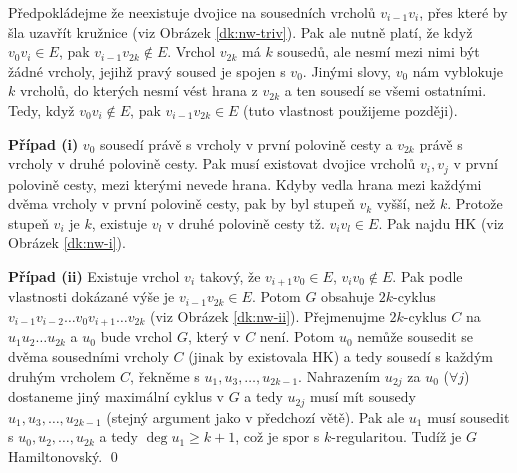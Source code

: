 Předpokládejme že neexistuje dvojice na sousedních vrcholů $v_{i-1}v_i$, přes které by šla uzavřít kružnice (viz Obrázek \ref{dk:nw-triv}). Pak ale nutně platí, že když $v_0v_i \in E$, pak $v_{i-1}v_{2k} \not\in E$. Vrchol $v_{2k}$ má $k$ sousedů, ale nesmí mezi nimi být žádné vrcholy, jejihž pravý soused je spojen s $v_0$. Jinými slovy, $v_0$ nám vyblokuje $k$ vrcholů, do kterých nesmí vést hrana z $v_{2k}$ a ten sousedí se všemi ostatními. Tedy, když $v_0v_i \not\in E$, pak $v_{i-1}v_{2k} \in E$ (tuto vlastnost použijeme později).

\textbf{Případ (i)} $v_0$ sousedí právě s vrcholy v první polovině cesty a $v_{2k}$ právě s vrcholy v druhé polovině cesty. Pak musí existovat dvojice vrcholů $v_i,v_j$ v první polovině cesty, mezi kterými nevede hrana. Kdyby vedla hrana mezi každými dvěma vrcholy v první polovině cesty, pak by byl stupeň $v_k$ vyšší, než $k$. Protože stupeň $v_i$ je $k$, existuje $v_l$ v druhé polovině cesty tž. $v_iv_l \in E$. Pak najdu HK (viz Obrázek \ref{dk:nw-i}).

\textbf{Případ (ii)} Existuje vrchol $v_i$ takový, že $v_{i+1}v_0 \in E$, $v_iv_0 \not\in E$. Pak podle vlastnosti dokázané výše je $v_{i-1}v_{2k} \in E$. Potom $G$ obsahuje $2k$-cyklus $v_{i-1}v_{i-2}\dots v_0v_{i+1}\dots v_{2k}$ (viz Obrázek \ref{dk:nw-ii}). Přejmenujme $2k$-cyklus $C$ na $u_1u_2\dots u_{2k}$ a $u_0$ bude vrchol $G$, který v $C$ není. Potom $u_0$ nemůže sousedit se dvěma sousedními vrcholy $C$ (jinak by existovala HK) a tedy sousedí s každým druhým vrcholem $C$, řekněme s $u_1, u_3, \dots, u_{2k-1}$. Nahrazením $u_{2j}$ za $u_0$ ($\forall j$) dostaneme jiný maximální cyklus v $G$ a tedy $u_{2j}$ musí mít sousedy $u_1, u_3, \dots, u_{2k-1}$ (stejný argument jako v předchozí větě). Pak ale $u_1$ musí sousedit s $u_0, u_2, \dots, u_{2k}$ a tedy $\deg u_1 \ge k+1$, což je spor s $k$-regularitou. Tudíž je $G$ Hamiltonovský.
\qed

